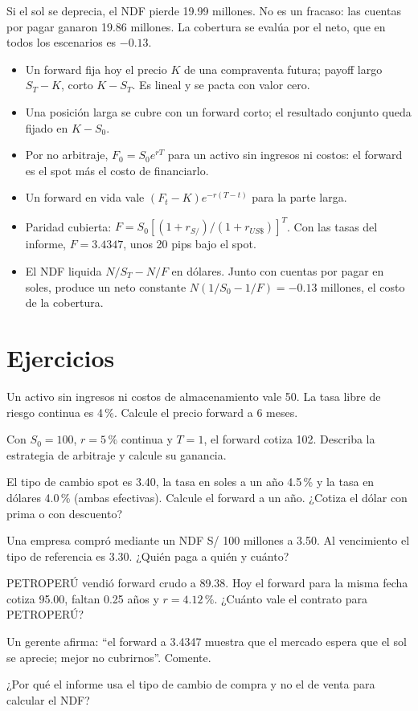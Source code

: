 \begin{cuidado}
Si el sol se deprecia, el NDF pierde 19.99 millones. No es un fracaso: las cuentas por pagar ganaron 19.86 millones. La cobertura se evalúa por el neto, que en todos los escenarios es $-0.13$.
\end{cuidado}

\begin{resumen}
\begin{itemize}
\item Un forward fija hoy el precio $K$ de una compraventa futura; payoff largo $S_T-K$, corto $K-S_T$. Es lineal y se pacta con valor cero.
\item Una posición larga se cubre con un forward corto; el resultado conjunto queda fijado en $K-S_0$.
\item Por no arbitraje, $F_0=S_0e^{rT}$ para un activo sin ingresos ni costos: el forward es el spot más el costo de financiarlo.
\item Un forward en vida vale $(F_t-K)e^{-r(T-t)}$ para la parte larga.
\item Paridad cubierta: $F=S_0[(1+r_{S/})/(1+r_{US\$})]^T$. Con las tasas del informe, $F=3.4347$, unos 20 pips bajo el spot.
\item El NDF liquida $N/S_T-N/F$ en dólares. Junto con cuentas por pagar en soles, produce un neto constante $N(1/S_0-1/F)=-0.13$ millones, el costo de la cobertura.
\end{itemize}
\end{resumen}

\section*{Ejercicios}

\ejercicio[cálculo] Un activo sin ingresos ni costos de almacenamiento vale 50. La tasa libre de riesgo continua es 4\,\%. Calcule el precio forward a 6 meses.

\ejercicio[cálculo] Con $S_0=100$, $r=5\,\%$ continua y $T=1$, el forward cotiza 102. Describa la estrategia de arbitraje y calcule su ganancia.

\ejercicio[cálculo] El tipo de cambio spot es 3.40, la tasa en soles a un año 4.5\,\% y la tasa en dólares 4.0\,\% (ambas efectivas). Calcule el forward a un año. ¿Cotiza el dólar con prima o con descuento?

\ejercicio[cálculo] Una empresa compró mediante un NDF S/ 100 millones a 3.50. Al vencimiento el tipo de referencia es 3.30. ¿Quién paga a quién y cuánto?

\ejercicio[cálculo] PETROPERÚ vendió forward crudo a 89.38. Hoy el forward para la misma fecha cotiza 95.00, faltan 0.25 años y $r=4.12\,\%$. ¿Cuánto vale el contrato para PETROPERÚ?

\ejercicio[conceptual] Un gerente afirma: \enquote{el forward a 3.4347 muestra que el mercado espera que el sol se aprecie; mejor no cubrirnos}. Comente.

\ejercicio[conceptual] ¿Por qué el informe usa el tipo de cambio de compra y no el de venta para calcular el NDF?
